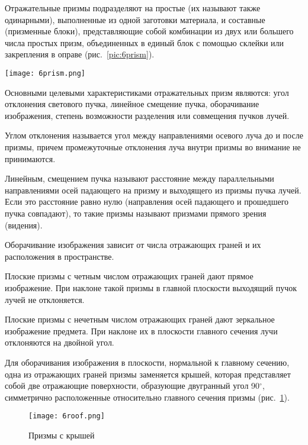 Отражательные призмы подразделяют на простые (их называют также одинарными), выполненные из одной заготовки материала, и составные (призменные блоки), представляющие собой комбинации из двух или большего числа простых призм, объединенных в единый блок с помощью склейки или закрепления в оправе (рис.~\ref{pic:6prism}).

\begin{figure*}[h!]
	\caption[Отражательные призмы с одним и двумя отражениями]{ Отражательные призмы с одним (а, в) и двумя отражениями (б) }
	\texttt{[image: 6prism.png]}
	\label{pic:6prism}
\end{figure*}

Основными целевыми характеристиками отражательных призм являются: угол отклонения светового пучка, линейное смещение пучка, оборачивание изображения, степень возможности разделения или совмещения пучков лучей.

Углом отклонения называется угол между направлениями осевого луча до и после призмы, причем промежуточные отклонения луча внутри призмы во внимание не принимаются.

Линейным, смещением пучка называют расстояние между параллельными направлениями осей падающего на призму и выходящего из призмы пучка лучей. Если это расстояние равно нулю (направления осей падающего и прошедшего пучка совпадают), то такие призмы называют призмами прямого зрения (видения).

Оборачивание изображения зависит от числа отражающих граней и их расположения в пространстве.

Плоские призмы с четным числом отражающих граней дают прямое изображение. При наклоне такой призмы в главной плоскости выходящий пучок лучей не отклоняется.

Плоские призмы с нечетным числом отражающих граней дают зеркальное изображение предмета. При наклоне их в плоскости главного сечения лучи отклоняются на двойной угол.

Для оборачивания изображения в плоскости, нормальной к главному сечению, одна из отражающих граней призмы заменяется крышей, которая представляет собой две отражающие поверхности, образующие двугранный угол 90$ ^\circ $, симметрично расположенные относительно главного сечения призмы (рис.~\ref{pic:6roof}).

\begin{figure}[h!]
	\texttt{[image: 6roof.png]}
	\caption{ Призмы с крышей }
	\label{pic:6roof}
\end{figure}

